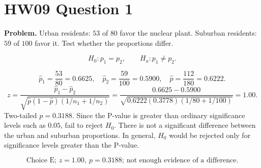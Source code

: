 \documentclass[11pt]{article}
\begin{document}
\section*{HW09 Question 1}

\textbf{Problem.} Urban residents: \(53\) of \(80\) favor the nuclear plant. Suburban residents: \(59\) of \(100\) favor it. Test whether the proportions differ.

\[
H_0:p_1=p_2,\qquad H_a:p_1\ne p_2.
\]

\[
\hat p_1=\frac{53}{80}=0.6625,\quad \hat p_2=\frac{59}{100}=0.5900,\quad
\hat p=\frac{112}{180}=0.6222.
\]
\[
z=\frac{\hat p_1-\hat p_2}{\sqrt{\hat p(1-\hat p)(1/n_1+1/n_2)}}=
\frac{0.6625-0.5900}{\sqrt{0.6222(0.3778)(1/80+1/100)}}=1.00.
\]
Two-tailed \(p=0.3188\). Since the P-value is greater than ordinary significance levels such as \(0.05\), fail to reject \(H_0\). There is not a significant difference between the urban and suburban proportions. In general, \(H_0\) would be rejected only for significance levels greater than the P-value.

\[
\boxed{\text{Choice E; }z=1.00,\ p=0.3188;\ \text{not enough evidence of a difference.}}
\]
\end{document}
